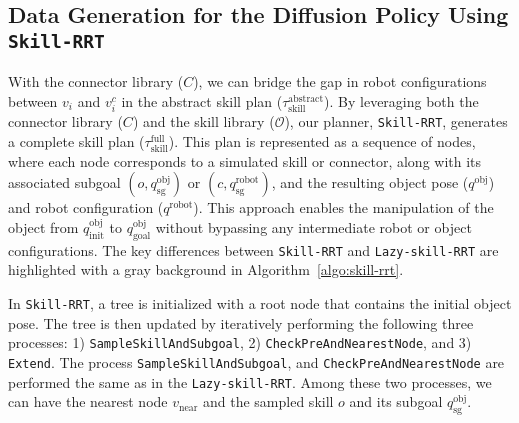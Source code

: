 \subsection{Data Generation for the Diffusion Policy Using \texttt{Skill-RRT}}
With the connector library (\(C\)), we can bridge the gap in robot configurations between \(v_i\) and \(v^c_i\) in the abstract skill plan (\(\tau^\text{abstract}_\text{skill}\)). By leveraging both the connector library (\(C\)) and the skill library (\(\mathcal{O}\)), our planner, \texttt{Skill-RRT}, generates a complete skill plan (\(\tau^\text{full}_\text{skill}\)). This plan is represented as a sequence of nodes, where each node corresponds to a simulated skill or connector, along with its associated subgoal \((o, q^\text{obj}_\text{sg})\) or \((c, q^\text{robot}_\text{sg})\), and the resulting object pose (\(q^\text{obj}\)) and robot configuration (\(q^\text{robot}\)). This approach enables the manipulation of the object from \(q^\text{obj}_\text{init}\) to \(q^\text{obj}_\text{goal}\) without bypassing any intermediate robot or object configurations. The key differences between \texttt{Skill-RRT} and \texttt{Lazy-skill-RRT} are highlighted with a gray background in Algorithm~\ref{algo:skill-rrt}.

In \texttt{Skill-RRT}, a tree is initialized with a root node that contains the initial object pose. The tree is then updated by iteratively performing the following three processes: 1) \texttt{SampleSkillAndSubgoal}, 2) \texttt{CheckPreAndNearestNode}, and 3) \texttt{Extend}. The process \texttt{SampleSkillAndSubgoal}, and \texttt{CheckPreAndNearestNode} are performed the same as in the \texttt{Lazy-skill-RRT}. Among these two processes, we can have the nearest node $v_\text{near}$ and the sampled skill $o$ and its subgoal $q^\text{obj}_\text{sg}$.

